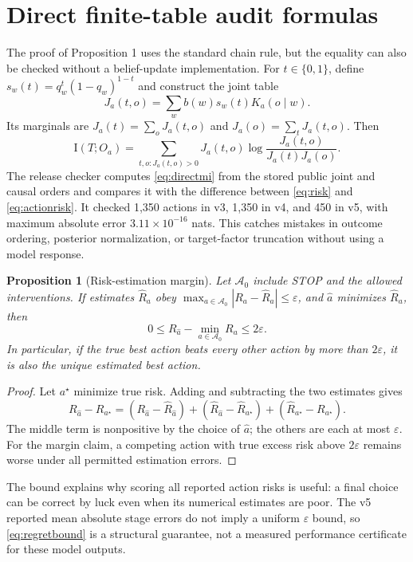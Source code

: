 \documentclass[10pt]{article}
\newtheorem{proposition}{Proposition}
\newcommand{\info}{\mathrm I}
\begin{document}
\appendix
\section{Direct finite-table audit formulas}
The proof of Proposition 1 uses the standard chain rule, but the equality can also be checked without a belief-update implementation. For $t\in\{0,1\}$, define $s_w(t)=q_w^t(1-q_w)^{1-t}$ and construct the joint table
\begin{equation}
 J_a(t,o)=\sum_w b(w)s_w(t)K_a(o\mid w).
 \label{eq:jointaudit}
\end{equation}
Its marginals are $J_a(t)=\sum_oJ_a(t,o)$ and $J_a(o)=\sum_tJ_a(t,o)$. Then
\begin{equation}
 \info(T;O_a)=\sum_{t,o:J_a(t,o)>0}J_a(t,o)
 \log\frac{J_a(t,o)}{J_a(t)J_a(o)}.
 \label{eq:directmi}
\end{equation}
The release checker computes \eqref{eq:directmi} from the stored public joint and causal orders and compares it with the difference between \eqref{eq:risk} and \eqref{eq:actionrisk}. It checked 1,350 actions in v3, 1,350 in v4, and 450 in v5, with maximum absolute error $3.11\times 10^{-16}$ nats. This catches mistakes in outcome ordering, posterior normalization, or target-factor truncation without using a model response.

\begin{proposition}[Risk-estimation margin]
Let $\mathcal A_0$ include STOP and the allowed interventions. If estimates $\widehat R_a$ obey $\max_{a\in\mathcal A_0}|R_a-\widehat R_a|\le\varepsilon$, and $\widehat a$ minimizes $\widehat R_a$, then
\begin{equation}
 0\le R_{\widehat a}-\min_{a\in\mathcal A_0}R_a\le 2\varepsilon.
 \label{eq:regretbound}
\end{equation}
In particular, if the true best action beats every other action by more than $2\varepsilon$, it is also the unique estimated best action.
\end{proposition}
\begin{proof}
Let $a^\star$ minimize true risk. Adding and subtracting the two estimates gives
\[
R_{\widehat a}-R_{a^\star}
=(R_{\widehat a}-\widehat R_{\widehat a})
+(\widehat R_{\widehat a}-\widehat R_{a^\star})
+(\widehat R_{a^\star}-R_{a^\star}).
\]
The middle term is nonpositive by the choice of $\widehat a$; the others are each at most $\varepsilon$. For the margin claim, a competing action with true excess risk above $2\varepsilon$ remains worse under all permitted estimation errors.
\end{proof}

The bound explains why scoring all reported action risks is useful: a final choice can be correct by luck even when its numerical estimates are poor. The v5 reported mean absolute stage errors do not imply a uniform $\varepsilon$ bound, so \eqref{eq:regretbound} is a structural guarantee, not a measured performance certificate for these model outputs.
\end{document}
